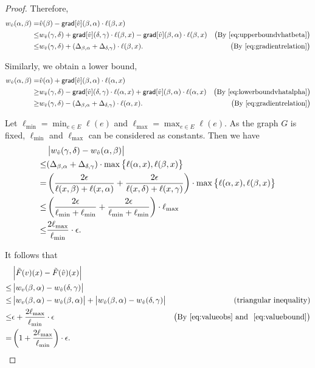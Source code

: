 \documentclass[12pt]{amsart}
\newcommand{\grad}{\ensuremath{\mathsf{grad}}}
\begin{document}
\begin{proof}
Therefore,
\begin{align*}
w_{\V{\hat{v}}}(\alpha,\beta) =& \V{\hat{v}}(\beta) - \grad[\V{\hat{v}}](\beta,\alpha)\cdot\ell(\beta,x) \\
\leq& w_{\V{\hat{v}}}(\gamma,\delta) + \grad[\V{\hat{v}}](\delta,\gamma) \cdot \ell(\beta,x) - \grad[\V{\hat{v}}](\beta,\alpha)\cdot\ell(\beta,x) &\paren{\text{By~\eqref{eq:upperboundvhatbeta}}}\\
\leq& w_{\V{\hat{v}}}(\gamma,\delta) + (\Delta_{\beta,\alpha}+\Delta_{\delta,\gamma})\cdot\ell(\beta,x). &\paren{\text{By~\eqref{eq:gradientrelation}}}
\end{align*}

Similarly, we obtain a lower bound,
\begin{align*}
w_{\V{\hat{v}}}(\alpha,\beta) =& \V{\hat{v}}(\alpha) + \grad[\V{\hat{v}}](\beta,\alpha)\cdot\ell(\alpha,x) \\
\geq& w_{\V{\hat{v}}}(\gamma,\delta) - \grad[\V{\hat{v}}](\delta,\gamma)\cdot\ell(\alpha,x) + \grad[\V{\hat{v}}](\beta,\alpha)\cdot\ell(\alpha,x) &\paren{\text{By~\eqref{eq:lowerboundvhatalpha}}}  \\
\geq&  w_{\V{\hat{v}}}(\gamma,\delta) - (\Delta_{\beta,\alpha}+\Delta_{\delta,\gamma})\cdot\ell(\alpha,x). &\paren{\text{By~\eqref{eq:gradientrelation}}}
\end{align*}

Let $\ell_{\min} = \min_{e\in E}\ell(e)$ and $\ell_{\max} = \max_{e\in E}\ell(e)$. As the graph $G$ is fixed, $\ell_{\min}$ and $\ell_{\max}$ can be considered as constants. Then we have
\begin{equation}\label{eq:valuebound}
\begin{split}
&\left| w_{\hat{v}}(\gamma,\delta) - w_{\hat{v}}(\alpha,\beta) \right| \\
\leq& (\Delta_{\beta,\alpha}+\Delta_{\delta,\gamma})\cdot\max\left\{\ell(\alpha,x), \ell(\beta,x)\right\} \\
=& \left({\frac{2\epsilon}{\ell(x,\beta)+\ell(x,\alpha)}+\frac{2\epsilon}{\ell(x,\delta)+\ell(x,\gamma)}}\right)\cdot\max\left\{\ell(\alpha,x), \ell(\beta,x)\right\}\\
\leq& \left({\frac{2\epsilon}{\ell_{\min}+\ell_{\min}}+\frac{2\epsilon}{\ell_{\min}+\ell_{\min}}}\right)\cdot\ell_{\max} \\
\leq& \frac{2\ell_{\max}}{\ell_{\min}}\cdot\epsilon.
\end{split}
\end{equation}

It follows that
\begin{align*}
& \left| \tilde{F}(v)(x)-\tilde{F}(\hat{v})(x) \right| \\
\leq& \left| w_{v}(\beta,\alpha) - w_{\hat{v}}(\delta,\gamma) \right| \\
\leq& \left| w_{v}(\beta,\alpha) - w_{\hat{v}}(\beta,\alpha) \right| + \left| w_{\hat{v}}(\beta,\alpha) - w_{\hat{v}}(\delta,\gamma) \right| &\left({\text{triangular inequality}}\right) \\
\leq& \epsilon + \frac{2\ell_{\max}}{\ell_{\min}}\cdot\epsilon &\left({\text{By~\eqref{eq:valueobs} and ~\eqref{eq:valuebound}}}\right)\\
=& \left({1+\frac{2\ell_{\max}}{\ell_{\min}}}\right)\cdot\epsilon.
\end{align*}


\end{proof}
\end{document}
